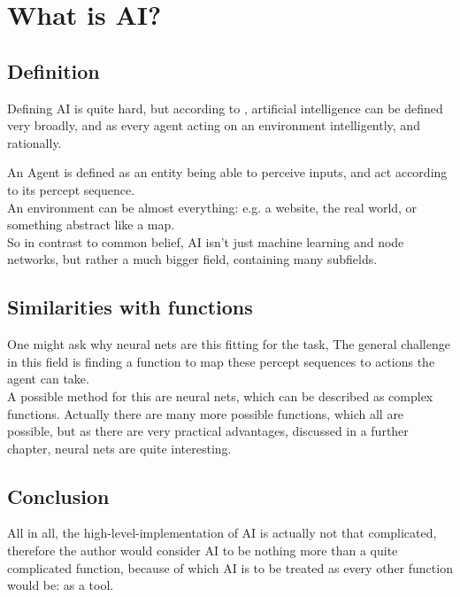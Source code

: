 \chapter{What is AI?}

\section{Definition}
Defining AI is quite hard, but according to \cite{russellArtificialIntelligenceModern2010}, artificial intelligence can be defined very broadly, and as every agent acting on an environment intelligently, and rationally.

An Agent is defined as an entity being able to perceive inputs, and act according to its percept sequence.\\ 
An environment can be almost everything: e.g. a website, the real world, or something abstract like a map.\\ 
So in contrast to common belief, AI isn't just machine learning and node networks, but rather a much bigger field, containing many subfields.

\section{Similarities with functions}
One might ask why neural nets are this fitting for the task,  The general challenge in this field is finding a function to map these percept sequences to actions the agent can take. \\ 
A possible method for this are neural nets, which can be described as complex functions. Actually there are many more possible functions, which all are possible, but as there are very practical advantages, discussed in a further chapter, neural nets are quite interesting.

\section{Conclusion}
All in all, the high-level-implementation of AI is actually not that complicated, therefore the author would consider AI to be nothing more than a quite complicated function, because of which AI is to be treated as every other function would be: as a tool. 